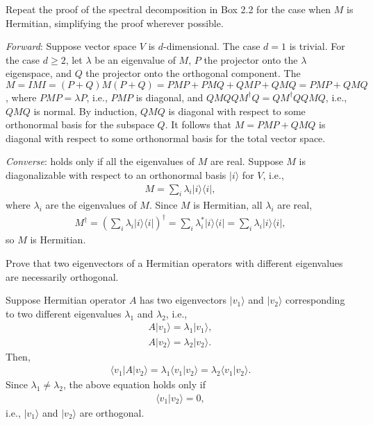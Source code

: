 \documentclass[en]{sol-man}
\begin{document}
\begin{exe}
    Repeat the proof of the spectral decomposition in Box 2.2 for the case when $M$ is Hermitian, simplifying the proof wherever possible.
\end{exe}
\begin{pf}
    \emph{Forward}: Suppose vector space $V$ is $d$-dimensional.
    The case $d=1$ is trivial.
    For the case $d\geq 2$, let $\lambda$ be an eigenvalue of $M$, $P$ the projector onto the $\lambda$ eigenspace, and $Q$ the projector onto the orthogonal component. The $M=IMI=(P+Q)M(P+Q)=PMP+PMQ+QMP+QMQ=PMP+QMQ$, where $PMP=\lambda P$, i.e., $PMP$ is diagonal, and $QMQQM^{\dagger}Q=QM^{\dagger}QQMQ$, i.e., $QMQ$ is normal. By induction, $QMQ$ is diagonal with respect to some orthonormal basis for the subspace $Q$. It follows that $M=PMP+QMQ$ is diagonal with respect to some orthonormal basis for the total vector space.

    \emph{Converse}: holds only if all the eigenvalues of $M$ are real. Suppose $M$ is diagonalizable with respect to an orthonormal basis $\lvert i\rangle$ for $V$, i.e.,
    \begin{align}
        M=\sum_i\lambda_i\lvert i\rangle\langle i\rvert,
    \end{align}
    where $\lambda_i$ are the eigenvalues of $M$.
    Since $M$ is Hermitian, all $\lambda_i$ are real,
    \begin{align}
        M^{\dagger}=\left(\sum_i\lambda_i\lvert i\rangle\langle i\rvert\right)^{\dagger}=\sum_i\lambda_i^*\lvert i\rangle\langle i\rvert=\sum_i\lambda_i\lvert i\rangle\langle i\rvert,
    \end{align}
    so $M$ is Hermitian.
\end{pf}

\begin{exe}
    Prove that two eigenvectors of a Hermitian operators with different eigenvalues are necessarily orthogonal.
\end{exe}
\begin{pf}
    Suppose Hermitian operator $A$ has two eigenvectors $\lvert v_1\rangle$ and $\lvert v_2\rangle$ corresponding to two different eigenvalues $\lambda_1$ and $\lambda_2$, i.e.,
    \begin{align}
        A\lvert v_1\rangle=\lambda_1\lvert v_1\rangle,\\
        A\lvert v_2\rangle=\lambda_2\lvert v_2\rangle.
    \end{align}
    Then,
    \begin{align}
        \langle v_1\rvert A\lvert v_2\rangle=\lambda_1\langle v_1\vert v_2\rangle=\lambda_2\langle v_1\vert v_2\rangle.
    \end{align}
    Since $\lambda_1\neq\lambda_2$, the above equation holds only if
    \begin{align}
        \langle v_1\vert v_2\rangle=0,
    \end{align}
    i.e., $\lvert v_1\rangle$ and $\lvert v_2\rangle$ are orthogonal.
\end{pf}
\end{document}
